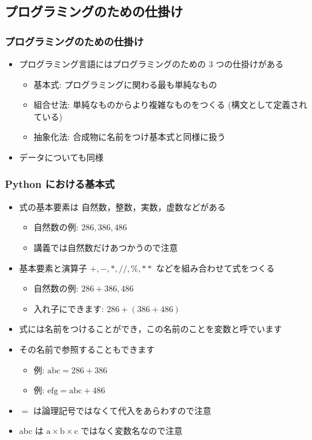 \subsection{プログラミングのための仕掛け}
\begin{frame}[fragile]
\frametitle{プログラミングのための仕掛け}
  \begin{itemize}
\item プログラミング言語にはプログラミングのための 3 つの仕掛けがある
    \begin{itemize}
\item 基本式: プログラミングに関わる最も単純なもの
\item 組合せ法: 単純なものからより複雑なものをつくる (構文として定義されている)
\item 抽象化法: 合成物に名前をつけ基本式と同様に扱う
    \end{itemize}
\item データについても同様
  \end{itemize}
\end{frame}
\begin{frame}[fragile]
\frametitle{Python における基本式}
  \begin{itemize}
\item 式の基本要素は 自然数，整数，実数，虚数などがある
    \begin{itemize}
\item 自然数の例: \(286, 386, 486\) 
\item 講義では自然数だけあつかうので注意
    \end{itemize}
\item 基本要素と演算子 \(+, -, *, \slash\slash, \%, **\) などを組み合わせて式をつくる
    \begin{itemize}
\item 自然数の例: \(286+386, 486\) 
\item 入れ子にできます: \(286+(386+486)\) 
    \end{itemize}
\item 式には名前をつけることができ，この名前のことを変数と呼でいます
\item その名前で参照することもできます
    \begin{itemize}
\item 例: \(\mbox{abc}=286+386\) 
\item 例: \(\mbox{efg}=\mbox{abc}+486\) 
    \end{itemize}
\item $=$ は論理記号ではなくて代入をあらわすので注意
\item abc は \(\mbox{a}\times\mbox{b}\times\mbox{c}\) ではなく変数名なので注意
  \end{itemize}
\end{frame}

